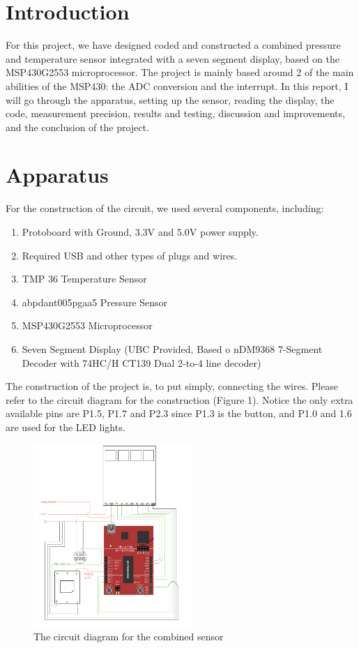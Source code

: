 \documentclass{article}
\begin{document}
\section{Introduction}
For this project, we have designed coded and constructed a combined pressure and temperature sensor integrated with a seven segment display, based on the MSP430G2553 microprocessor. The project is mainly based around 2 of the main abilities of the MSP430: the ADC conversion and the interrupt. In this report, I will go through the apparatus, setting up the sensor, reading the display, the code, measurement precision, results and testing, discussion and improvements, and the conclusion of the project.

\section{Apparatus} 
For the construction of the circuit, we used several components, including:
\begin{enumerate}
  \item Protoboard with Ground, 3.3V and 5.0V power supply. 
  \item Required USB and other types of plugs and wires. 
  \item TMP 36 Temperature Sensor
  \item abpdant005pgaa5 Pressure Sensor
  \item MSP430G2553 Microprocessor
  \item Seven Segment Display (UBC Provided, Based o nDM9368 7-Segment Decoder with 74HC/H CT139 Dual 2-to-4 line decoder) 
\end{enumerate}

The construction of the project is, to put simply, connecting the wires. Please refer to the circuit diagram for the construction (Figure 1).  Notice the only extra available pins are P1.5, P1.7 and P2.3 since P1.3 is the button, and P1.0 and 1.6 are used for the LED lights. 

\begin{figure}[h]
    \centering
    \includegraphics[width=6cm]{Circuit Diagram.jpg}
    \caption{The circuit diagram for the combined sensor}
\end{figure} 
\end{document}

